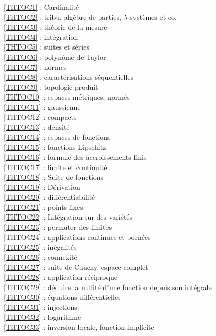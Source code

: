 \ref {THTOC1} : Cardinalité\\
\ref {THTOC2} : tribu, algèbre de parties, \( \lambda \)-systèmes et co.\\
\ref {THTOC3} : théorie de la mesure\\
\ref {THTOC4} : intégration\\
\ref {THTOC5} : suites et séries\\
\ref {THTOC6} : polynôme de Taylor\\
\ref {THTOC7} : normes\\
\ref {THTOC8} : caractérisations séquentielles\\
\ref {THTOC9} : topologie produit\\
\ref {THTOC10} : espaces métriques, normés\\
\ref {THTOC11} : gaussienne\\
\ref {THTOC12} : compacts\\
\ref {THTOC13} : densité\\
\ref {THTOC14} : espaces de fonctions\\
\ref {THTOC15} : fonctions Lipschitz\\
\ref {THTOC16} : formule des accroissements finis\\
\ref {THTOC17} : limite et continuité\\
\ref {THTOC18} : Suite de fonctions\\
\ref {THTOC19} : Dérivation\\
\ref {THTOC20} : différentiabilité\\
\ref {THTOC21} : points fixes\\
\ref {THTOC22} : Intégration sur des variétés\\
\ref {THTOC23} : permuter des limites\\
\ref {THTOC24} : applications continues et bornées\\
\ref {THTOC25} : inégalités\\
\ref {THTOC26} : connexité\\
\ref {THTOC27} : suite de Cauchy, espace complet\\
\ref {THTOC28} : application réciproque\\
\ref {THTOC29} : déduire la nullité d'une fonction depuis son intégrale\\
\ref {THTOC30} : équations différentielles\\
\ref {THTOC31} : injections\\
\ref {THTOC32} : logarithme\\
\ref {THTOC33} : inversion locale, fonction implicite\\
